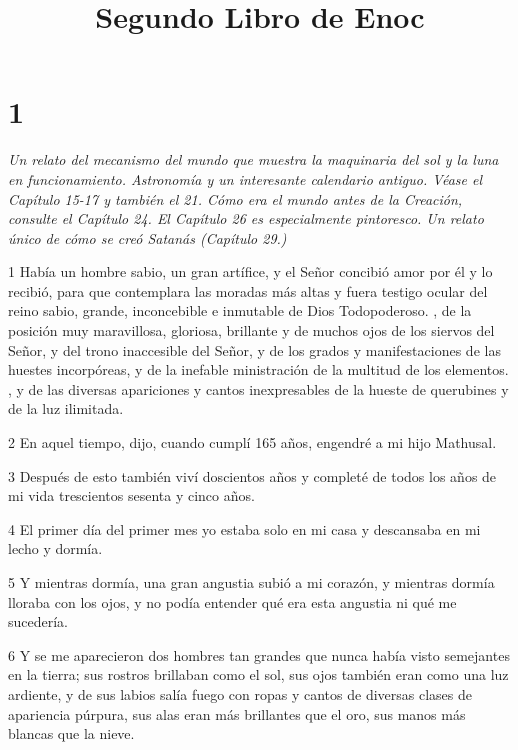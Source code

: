 

\title{Segundo Libro de Enoc}

\chapter{1}

\par \textit{Un relato del mecanismo del mundo que muestra la maquinaria del sol y la luna en funcionamiento. Astronomía y un interesante calendario antiguo. Véase el Capítulo 15-17 y también el 21. Cómo era el mundo antes de la Creación, consulte el Capítulo 24. El Capítulo 26 es especialmente pintoresco. Un relato único de cómo se creó Satanás (Capítulo 29.)}

\par 1 Había un hombre sabio, un gran artífice, y el Señor concibió amor por él y lo recibió, para que contemplara las moradas más altas y fuera testigo ocular del reino sabio, grande, inconcebible e inmutable de Dios Todopoderoso. , de la posición muy maravillosa, gloriosa, brillante y de muchos ojos de los siervos del Señor, y del trono inaccesible del Señor, y de los grados y manifestaciones de las huestes incorpóreas, y de la inefable ministración de la multitud de los elementos. , y de las diversas apariciones y cantos inexpresables de la hueste de querubines y de la luz ilimitada.

\par 2 En aquel tiempo, dijo, cuando cumplí 165 años, engendré a mi hijo Mathusal.

\par 3 Después de esto también viví doscientos años y completé de todos los años de mi vida trescientos sesenta y cinco años.

\par 4 El primer día del primer mes yo estaba solo en mi casa y descansaba en mi lecho y dormía.

\par 5 Y mientras dormía, una gran angustia subió a mi corazón, y mientras dormía lloraba con los ojos, y no podía entender qué era esta angustia ni qué me sucedería.

\par 6 Y se me aparecieron dos hombres tan grandes que nunca había visto semejantes en la tierra; sus rostros brillaban como el sol, sus ojos también eran como una luz ardiente, y de sus labios salía fuego con ropas y cantos de diversas clases de apariencia púrpura, sus alas eran más brillantes que el oro, sus manos más blancas que la nieve.

